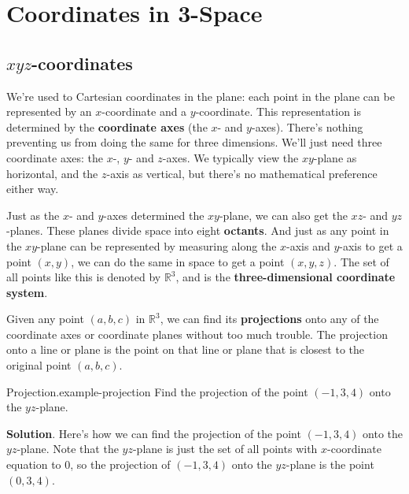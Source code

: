\documentclass[10pt,]{book}
\newcommand{\terminology}[1]{\textbf{#1}}
\numberwithin{equation}{section}
\newcommand{\RR}{\mathbb{R}}
\begin{document}
\section[{Coordinates in 3-Space}]{Coordinates in 3-Space}\label{section-coordinates-in-3-space}
%
%
\typeout{************************************************}
\typeout{************************************************}
%
\subsection[{\(xyz\)-coordinates}]{\(xyz\)-coordinates}\label{xyz-coordinates}
\hypertarget{p-1062}{}%
We're used to Cartesian coordinates in the plane: each point in the plane can be represented by an \(x\)-coordinate and a \(y\)-coordinate. This representation is determined by the \terminology{coordinate axes} (the \(x\)- and \(y\)-axes). There's nothing preventing us from doing the same for three dimensions. We'll just need three coordinate axes: the \(x\)-, \(y\)- and \(z\)-axes. We typically view the \(xy\)-plane as horizontal, and the \(z\)-axis as vertical, but there's no mathematical preference either way.%
\par
\hypertarget{p-1063}{}%
Just as the \(x\)- and \(y\)-axes determined the \(xy\)-plane, we can also get the \(xz\)- and \(yz\)-planes. These planes divide space into eight \terminology{octants}. And just as any point in the \(xy\)-plane can be represented by measuring along the \(x\)-axis and \(y\)-axis to get a point \((x,y)\), we can do the same in space to get a point \((x,y,z)\). The set of all points like this is denoted by \(\RR^{3}\), and is the \terminology{three-dimensional coordinate system}.%
\par
\hypertarget{p-1064}{}%
Given any point \((a,b,c)\) in \(\RR^{3}\), we can find its \terminology{projections} onto any of the coordinate axes or coordinate planes without too much trouble. The projection onto a line or plane is the point on that line or plane that is closest to the original point \((a,b,c)\).%
\begin{example}{Projection.}{example-projection}%
\hypertarget{p-1065}{}%
Find the projection of the point \((-1,3,4)\) onto the \(yz\)-plane.%
\par\smallskip%
\noindent\textbf{Solution}.\hypertarget{solution-204}{}\quad%
\hypertarget{p-1066}{}%
Here's how we can find the projection of the point \((-1,3,4)\) onto the \(yz\)-plane. Note that the \(yz\)-plane is just the set of all points with \(x\)-coordinate equation to \(0\), so the projection of \((-1,3,4)\) onto the \(yz\)-plane is the point \((0,3,4)\).%
\end{example}
\end{document}
